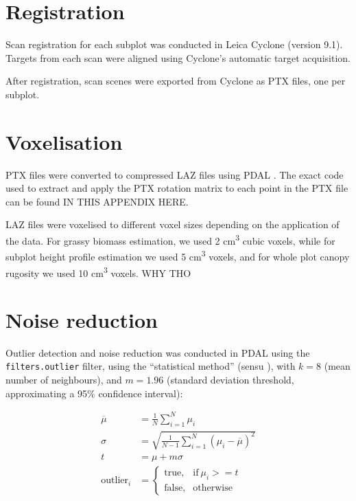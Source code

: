 \documentclass[11pt,a4paper]{article}
\begin{document}
\section{Registration}

Scan registration for each subplot was conducted in Leica Cyclone (version 9.1). Targets from each scan were aligned using Cyclone's automatic target acquisition. 

After registration, scan scenes were exported from Cyclone as PTX files, one per subplot.

\section{Voxelisation}

PTX files were converted to compressed LAZ files using PDAL \citep{}. The exact code used to extract and apply the PTX rotation matrix to each point in the PTX file can be found IN THIS APPENDIX HERE. 

LAZ files were voxelised to different voxel sizes depending on the application of the data. For grassy biomass estimation, we used 2 cm\textsuperscript{3} cubic voxels, while for subplot height profile estimation we used 5 cm\textsuperscript{3} voxels, and for whole plot canopy rugosity we used 10 cm\textsuperscript{3} voxels. WHY THO

\section{Noise reduction}

Outlier detection and noise reduction was conducted in PDAL using the \texttt{filters.outlier} filter, using the ``statistical method'' (sensu \citealt{Rusu2008}), with $k = 8$ (mean number of neighbours), and $m = 1.96$ (standard deviation threshold, approximating a 95\% confidence interval):

\begin{align}
	\overline{\mu} &= \frac{1}{N} \sum_{i=1}^{N} \mu_{i} \\
	\sigma &= \sqrt{\frac{1}{N-1} \sum_{i=1}^{N}(\mu_{i} - \overline{\mu{}})^2} \\
	t &= \mu + m \sigma \\
	\text{outlier}_{i} &= 
		\begin{cases}
			\text{true}, & \text{if}\ \mu_{i} >= t \\
			\text{false}, & \text{otherwise}
		\end{cases}
\end{align}
\end{document}

